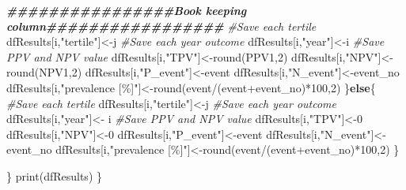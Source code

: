 \documentclass[
]{article}
\newenvironment{Shaded}{\begin{snugshade}}{\end{snugshade}}
\newcommand{\CommentTok}[1]{\textcolor[rgb]{0.56,0.35,0.01}{\textit{#1}}}
\newcommand{\ControlFlowTok}[1]{\textcolor[rgb]{0.13,0.29,0.53}{\textbf{#1}}}
\newcommand{\DecValTok}[1]{\textcolor[rgb]{0.00,0.00,0.81}{#1}}
\newcommand{\DocumentationTok}[1]{\textcolor[rgb]{0.56,0.35,0.01}{\textbf{\textit{#1}}}}
\newcommand{\FunctionTok}[1]{\textcolor[rgb]{0.00,0.00,0.00}{#1}}
\newcommand{\NormalTok}[1]{#1}
\newcommand{\OtherTok}[1]{\textcolor[rgb]{0.56,0.35,0.01}{#1}}
\newcommand{\SpecialCharTok}[1]{\textcolor[rgb]{0.00,0.00,0.00}{#1}}
\newcommand{\StringTok}[1]{\textcolor[rgb]{0.31,0.60,0.02}{#1}}
\begin{document}
\begin{Shaded}
\begin{Highlighting}[]
    \DocumentationTok{\#\#\#\#\#\#\#\#\#\#\#\#\#\#\#\#Book keeping column\#\#\#\#\#\#\#\#\#\#\#\#\#\#\#\#\#}
    \CommentTok{\#Save each tertile}
\NormalTok{    dfResults[i,}\StringTok{"tertile"}\NormalTok{]}\OtherTok{\textless{}{-}}\NormalTok{j}
    \CommentTok{\#Save each year outcome}
\NormalTok{    dfResults[i,}\StringTok{"year"}\NormalTok{]}\OtherTok{\textless{}{-}}\NormalTok{i}
    \CommentTok{\#Save PPV and NPV value}
\NormalTok{    dfResults[i,}\StringTok{"TPV"}\NormalTok{]}\OtherTok{\textless{}{-}}\FunctionTok{round}\NormalTok{(PPV1,}\DecValTok{2}\NormalTok{)}
\NormalTok{    dfResults[i,}\StringTok{"NPV"}\NormalTok{]}\OtherTok{\textless{}{-}}\FunctionTok{round}\NormalTok{(NPV1,}\DecValTok{2}\NormalTok{)}
\NormalTok{    dfResults[i,}\StringTok{"P\_event"}\NormalTok{]}\OtherTok{\textless{}{-}}\NormalTok{event}
\NormalTok{    dfResults[i,}\StringTok{"N\_event"}\NormalTok{]}\OtherTok{\textless{}{-}}\NormalTok{event\_no}
\NormalTok{    dfResults[i,}\StringTok{"prevalence [\%]"}\NormalTok{]}\OtherTok{\textless{}{-}}\FunctionTok{round}\NormalTok{(event}\SpecialCharTok{/}\NormalTok{(event}\SpecialCharTok{+}\NormalTok{event\_no)}\SpecialCharTok{*}\DecValTok{100}\NormalTok{,}\DecValTok{2}\NormalTok{)}
\NormalTok{    \}}\ControlFlowTok{else}\NormalTok{\{}
     \CommentTok{\#Save each tertile}
\NormalTok{    dfResults[i,}\StringTok{"tertile"}\NormalTok{]}\OtherTok{\textless{}{-}}\NormalTok{j}
    \CommentTok{\#Save each year outcome}
\NormalTok{    dfResults[i,}\StringTok{"year"}\NormalTok{]}\OtherTok{\textless{}{-}}\NormalTok{ i}
    \CommentTok{\#Save PPV and NPV value}
\NormalTok{    dfResults[i,}\StringTok{"TPV"}\NormalTok{]}\OtherTok{\textless{}{-}}\DecValTok{0}
\NormalTok{    dfResults[i,}\StringTok{"NPV"}\NormalTok{]}\OtherTok{\textless{}{-}}\DecValTok{0}
\NormalTok{    dfResults[i,}\StringTok{"P\_event"}\NormalTok{]}\OtherTok{\textless{}{-}}\NormalTok{event}
\NormalTok{    dfResults[i,}\StringTok{"N\_event"}\NormalTok{]}\OtherTok{\textless{}{-}}\NormalTok{event\_no}
\NormalTok{    dfResults[i,}\StringTok{"prevalence [\%]"}\NormalTok{]}\OtherTok{\textless{}{-}}\FunctionTok{round}\NormalTok{(event}\SpecialCharTok{/}\NormalTok{(event}\SpecialCharTok{+}\NormalTok{event\_no)}\SpecialCharTok{*}\DecValTok{100}\NormalTok{,}\DecValTok{2}\NormalTok{)}
\NormalTok{    \}}

\NormalTok{  \}}
  \FunctionTok{print}\NormalTok{(dfResults)}
\NormalTok{\}}
\end{Highlighting}
\end{Shaded}
\end{document}
